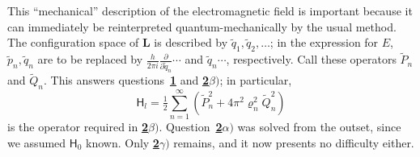\documentclass[fontsize=13pt,twoside,openany,headings=normal,parskip=false,bookmarkpackage=false,DIV=calc]{scrbook}
\begin{document}
This ``mechanical'' description of the electromagnetic field is important because it can immediately be reinterpreted quantum-mechanically by the usual method. The configuration space of $\boldsymbol{L}$ is described by $\widetilde q_1,\widetilde q_2,\ldots$; in the expression for $E$, $\widetilde p_n,\widetilde q_n$ are to be replaced by $\frac{h}{2\pi i}\frac{\partial}{\partial\widetilde q_n}\cdots$ and $\widetilde q_n\cdots$, respectively. Call these operators $\widetilde P_n$ and $\widetilde Q_n$.
\hypertarget{origpage-140}{}%
This answers questions~\hyperref[problem:III.6.1]{\textbf{1}} and \hyperref[problem:III.6.2beta]{\textbf{2}$\beta)$}; in particular,
\[
 \mathsf{H}_l=\tfrac12\sum_{n=1}^{\infty}(\widetilde P_n^2+4\pi^2\varrho_n^2\widetilde Q_n^2)
\]
is the operator required in \hyperref[problem:III.6.2beta]{\textbf{2}$\beta)$}. Question~\hyperref[problem:III.6.2alpha]{\textbf{2}$\alpha)$} was solved from the outset, since we assumed $\mathsf{H}_0$ known. Only \hyperref[problem:III.6.2gamma]{\textbf{2}$\gamma)$} remains, and it now presents no difficulty either.
\end{document}

